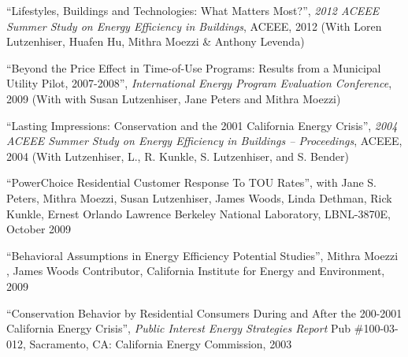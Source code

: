 \documentclass[Computer Science]{vita}
\begin{document}
\begin{vita}
\begin{Selected Publications}
\begin{Papers in Refereed Journals}

    \end{Papers in Refereed Journals}

    \begin{Papers at Refereed Conferences}
    \item ``Lifestyles, Buildings and Technologies: What Matters Most?'', \emph{2012 ACEEE Summer Study
        on Energy Efficiency in Buildings}, ACEEE, 2012 (With Loren Lutzenhiser, Huafen Hu, Mithra Moezzi \& Anthony Levenda)

   \item ``Beyond the Price Effect in Time-of-Use Programs: Results
      from a Municipal Utility Pilot, 2007-2008'', \emph{International
        Energy Program Evaluation Conference}, 2009 (With with Susan
      Lutzenhiser, Jane Peters and Mithra Moezzi)

   \item ``Lasting Impressions: Conservation and the 2001 California
      Energy Crisis'', \emph{2004 ACEEE Summer Study on Energy
        Efficiency in Buildings -- Proceedings}, ACEEE, 2004 (With
      Lutzenhiser, L., R. Kunkle, S. Lutzenhiser, and S. Bender)

    
    
    \end{Papers at Refereed Conferences}
   
    \begin{Unrefereed Public Reports}
    
    \item ``PowerChoice Residential Customer Response To TOU Rates'',
      with Jane S. Peters, Mithra Moezzi, Susan Lutzenhiser, James
      Woods, Linda Dethman, Rick Kunkle, Ernest Orlando Lawrence
      Berkeley National Laboratory, LBNL-3870E, October 2009

    \item ``Behavioral Assumptions in Energy Efficiency Potential
      Studies'', Mithra Moezzi , James Woods Contributor, California
      Institute for Energy and Environment, 2009

    \item ``Conservation Behavior by Residential Consumers During and
      After the 200-2001 California Energy Crisis'', \emph{Public
        Interest Energy Strategies Report} Pub \#100-03-012,
      Sacramento, CA: California Energy Commission, 2003


\end{Unrefereed Public Reports}
\end{Selected Publications}
\end{vita}
\end{document}
